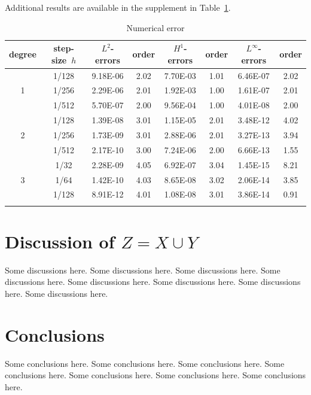 \documentclass{article}
\theoremstyle{plain}
\theoremstyle{definition}
\theoremstyle{remark}
\numberwithin{equation}{section}
\numberwithin{figure}{section}
\numberwithin{table}{section}
\begin{document}
Additional results are available in the supplement in Table~\ref{tab:error}.

\clearpage
\begin{table}[htp!]
\centering
\setlength{\tabcolsep}{8pt}
\renewcommand\arraystretch{1.2}
\caption{Numerical error}
\label{tab:error}
\begin{tabular}{c|c|cc|cc|cc}
\Xhline{2\arrayrulewidth}
degree & step-size~$h$ & $L^2$-errors & order & $H^1$-errors & order & $L^\infty$-errors & order \\
\hline
\multirow{3}{*}{1}
  & 1/128 & 9.18E-06 & 2.02 & 7.70E-03 & 1.01 & 6.46E-07 & 2.02 \\
  & 1/256 & 2.29E-06 & 2.01 & 1.92E-03 & 1.00 & 1.61E-07 & 2.01 \\
  & 1/512 & 5.70E-07 & 2.00 & 9.56E-04 & 1.00 & 4.01E-08 & 2.00 \\
\hline  %
\multirow{3}{*}{2}
  & 1/128 & 1.39E-08 & 3.01 & 1.15E-05 & 2.01 & 3.48E-12 & 4.02 \\
  & 1/256 & 1.73E-09 & 3.01 & 2.88E-06 & 2.01 & 3.27E-13 & 3.94 \\
  & 1/512 & 2.17E-10 & 3.00 & 7.24E-06 & 2.00 & 6.66E-13 & 1.55 \\
\hline  %
\multirow{3}{*}{3}
  & 1/32  & 2.28E-09 & 4.05 & 6.92E-07 & 3.04 & 1.45E-15 & 8.21 \\
  & 1/64  & 1.42E-10 & 4.03 & 8.65E-08 & 3.02 & 2.06E-14 & 3.85 \\
  & 1/128 & 8.91E-12 & 4.01 & 1.08E-08 & 3.01 & 3.86E-14 & 0.91 \\
\Xhline{2\arrayrulewidth}
\end{tabular}
\end{table}


\section{Discussion of \texorpdfstring{{\boldmath$Z=X \cup Y$}}{Z = X union Y}}
\label{sec:discussion}

Some discussions here. Some discussions here. Some discussions here.
Some discussions here. Some discussions here. Some discussions here.
Some discussions here. Some discussions here.

\section{Conclusions}
\label{sec:conclusions}

Some conclusions here. Some conclusions here. Some conclusions here.
Some conclusions here. Some conclusions here. Some conclusions here.
Some conclusions here.
\end{document}
